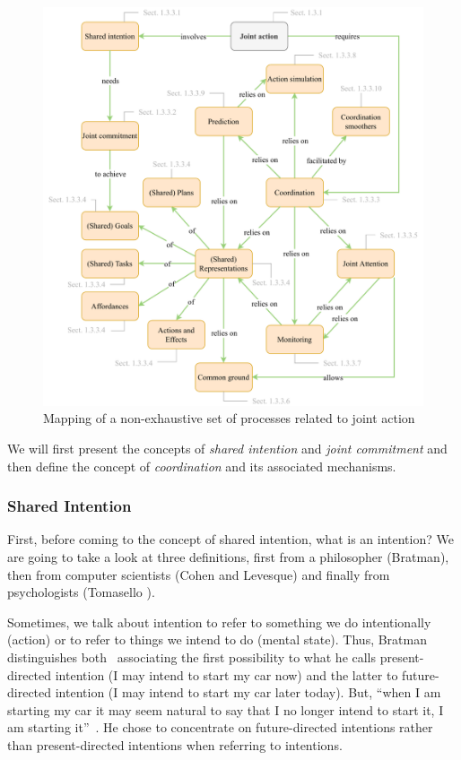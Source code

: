 \documentclass[a4paper,11pt,twoside]{StyleThese}
\begin{document}
\begin{figure}[!ht]
	\includegraphics[width=\linewidth]{figures/chapter1/joint_action.pdf}
	\caption{Mapping of a non-exhaustive set of processes related to joint action}
	\label{chap1:fig:ja}
\end{figure}

We will first present the concepts of \emph{shared intention} and \emph{joint commitment} and then define the concept of \emph{coordination} and its associated mechanisms. 

\subsubsection{Shared Intention}
First, before coming to the concept of shared intention, what is an intention? We are going to take a look at three definitions, first from a philosopher (Bratman), then from computer scientists (Cohen and Levesque) and finally from psychologists (Tomasello \etal). 

Sometimes, we talk about intention to refer to something we do intentionally (action) or to refer to things we intend to do (mental state). Thus, Bratman distinguishes both~\cite{bratman_1984_two} associating the first possibility to what he calls present-directed intention (I may intend to start my car now) and the latter to future-directed intention (I may intend to start my car later today). But, ``when I am starting my car it may seem natural to say that I no longer intend to start it, I am starting it''~\cite[p.~379]{bratman_1984_two}. He chose to concentrate on future-directed intentions rather than present-directed intentions when referring to intentions. 
\end{document}
